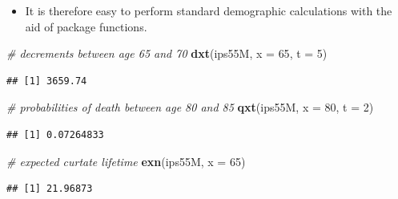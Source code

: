 \documentclass[ignorenonframetext,]{beamer}
\newenvironment{Shaded}{\begin{snugshade}}{\end{snugshade}}
\newcommand{\KeywordTok}[1]{\textcolor[rgb]{0.13,0.29,0.53}{\textbf{{#1}}}}
\newcommand{\DataTypeTok}[1]{\textcolor[rgb]{0.13,0.29,0.53}{{#1}}}
\newcommand{\DecValTok}[1]{\textcolor[rgb]{0.00,0.00,0.81}{{#1}}}
\newcommand{\CommentTok}[1]{\textcolor[rgb]{0.56,0.35,0.01}{\textit{{#1}}}}
\newcommand{\NormalTok}[1]{{#1}}
\begin{document}
\begin{frame}[fragile]

\begin{itemize}[<+->]
\itemsep1pt\parskip0pt
\item
  It is therefore easy to perform standard demographic calculations with
  the aid of package functions.
\end{itemize}

\begin{Shaded}
\begin{Highlighting}[]
\CommentTok{# decrements between age 65 and 70}
\KeywordTok{dxt}\NormalTok{(ips55M, }\DataTypeTok{x =} \DecValTok{65}\NormalTok{, }\DataTypeTok{t =} \DecValTok{5}\NormalTok{)}
\end{Highlighting}
\end{Shaded}

\begin{verbatim}
## [1] 3659.74
\end{verbatim}

\begin{Shaded}
\begin{Highlighting}[]
\CommentTok{# probabilities of death between age 80 and 85}
\KeywordTok{qxt}\NormalTok{(ips55M, }\DataTypeTok{x =} \DecValTok{80}\NormalTok{, }\DataTypeTok{t =} \DecValTok{2}\NormalTok{)}
\end{Highlighting}
\end{Shaded}

\begin{verbatim}
## [1] 0.07264833
\end{verbatim}

\begin{Shaded}
\begin{Highlighting}[]
\CommentTok{# expected curtate lifetime}
\KeywordTok{exn}\NormalTok{(ips55M, }\DataTypeTok{x =} \DecValTok{65}\NormalTok{)}
\end{Highlighting}
\end{Shaded}

\begin{verbatim}
## [1] 21.96873
\end{verbatim}

\end{frame}
\end{document}
